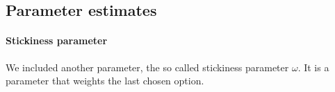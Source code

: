 
\subsection{Parameter estimates}
\paragraph{Stickiness parameter}
We included another parameter, the so called stickiness parameter $\omega$. It is a parameter that weights the last chosen option. 
